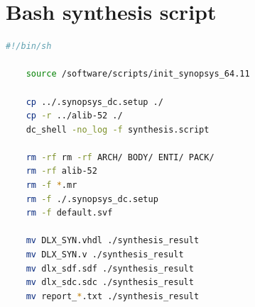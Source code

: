 \newappendix\label{ap2}
\section{Bash synthesis script}
\begin{lstlisting}[language=bash,caption={Bash script for the DLX synthesis},label=bash_syn]
	#!/bin/sh
		
	source /software/scripts/init_synopsys_64.11
	
	cp ../.synopsys_dc.setup ./
	cp -r ../alib-52 ./
	dc_shell -no_log -f synthesis.script
	
	rm -rf rm -rf ARCH/ BODY/ ENTI/ PACK/
	rm -rf alib-52
	rm -f *.mr
	rm -f ./.synopsys_dc.setup 
	rm -f default.svf
	
	mv DLX_SYN.vhdl ./synthesis_result
	mv DLX_SYN.v ./synthesis_result
	mv dlx_sdf.sdf ./synthesis_result
	mv dlx_sdc.sdc ./synthesis_result
	mv report_*.txt ./synthesis_result
\end{lstlisting}

